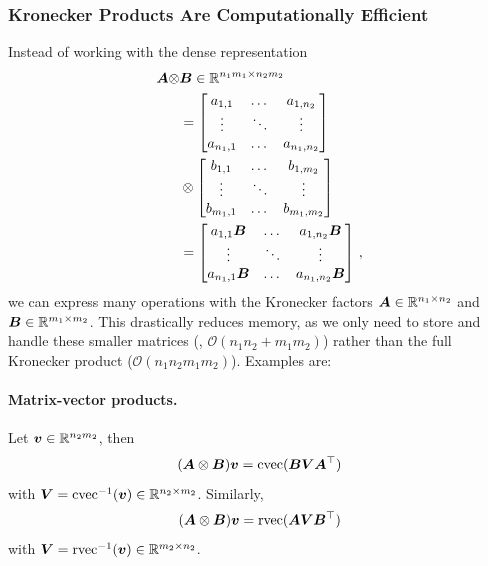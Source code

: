 \subsubsection{Kronecker Products Are Computationally Efficient}
\label{sec:mem_comp_eff_kron}
Instead of working with the dense representation
\begin{align*} {\bm{A}} \otimes& {\bm{B}}  \in \mathbb{R}^{n_1m_1 \times n_2m_2} \\
                          &=\begin{bmatrix}
                            a_{1,1} & \dots & a_{1,n_2} \\
                            \vdots & \ddots & \vdots \\
                            a_{n_1,1} & \dots & a_{n_1,n_2}
                          \end{bmatrix}
  \\
                          &\otimes
                            \begin{bmatrix}
                              b_{1,1} & \dots & b_{1,m_2} \\
                              \vdots & \ddots & \vdots \\
                              b_{m_1,1} &  \dots & b_{m_1,m_2}
                            \end{bmatrix} \\
                          &=\begin{bmatrix}
                            a_{1,1} {\bm{B}} & \dots & a_{1,n_2} {\bm{B}} \\
                            \vdots & \ddots & \vdots \\
                            a_{n_1,1} {\bm{B}} & \dots & a_{n_1,n_2} {\bm{B}}
                          \end{bmatrix}\,,
\end{align*}
we can express many operations with the Kronecker factors ${\bm{A}} \in {\mathbb{R}}^{n_1 \times n_2}$ and ${\bm{B}} \in {\mathbb{R}}^{m_1 \times m_2}$.
This drastically reduces memory, as we only need to store and handle these smaller matrices (\ie, $\mathcal{O}(n_1n_2 + m_1m_2)$) rather than the full Kronecker product (\ie $\mathcal{O}(n_1n_2m_1m_2)$).
Examples are:

\paragraph{Matrix-vector products.}
Let ${\bm{v}} \in \mathbb{R}^{n_2m_2}$, then
$$ ({\bm{A}} \otimes {\bm{B}}) {\bm{v}} = \operatorname{cvec}({\bm{B}} {\bm{V}} {\bm{A}}^{\top}) $$
with ${\bm{V}} = \operatorname{cvec}^{-1}({\bm{v}}) \in \mathbb{R}^{n_2\times m_2}$.
Similarly,
$$ ({\bm{A}} \otimes {\bm{B}}) {\bm{v}} = \operatorname{rvec}({\bm{A}} {\bm{V}} {\bm{B}}^{\top}) $$
with ${\bm{V}} = \operatorname{rvec}^{-1}({\bm{v}}) \in \mathbb{R}^{m_2\times n_2}$.

